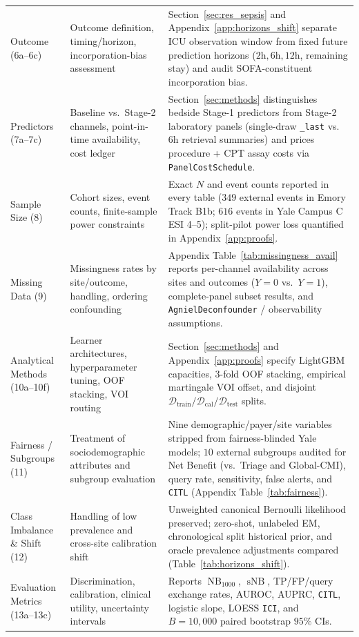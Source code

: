 \begin{table}[h!]
\begin{tabular}{>{\raggedright\arraybackslash}p{}>{\raggedright\arraybackslash}p{}>{\raggedright\arraybackslash}p{}}
Outcome (6a--6c) & Outcome definition, timing/horizon, incorporation-bias assessment & Section~\ref{sec:res_sepsis} and Appendix~\ref{app:horizons_shift} separate ICU observation window from fixed future prediction horizons ($2\text{h}, 6\text{h}, 12\text{h}$, remaining stay) and audit SOFA-constituent incorporation bias. \\
Predictors (7a--7c) & Baseline vs.\ Stage-2 channels, point-in-time availability, cost ledger & Section~\ref{sec:methods} distinguishes bedside Stage-1 predictors from Stage-2 laboratory panels (single-draw \texttt{\_last} vs.\ $6\text{h}$ retrieval summaries) and prices procedure + CPT assay costs via \texttt{PanelCostSchedule}. \\
Sample Size (8) & Cohort sizes, event counts, finite-sample power constraints & Exact $N$ and event counts reported in every table ($349$ external events in Emory Track B1b; $616$ events in Yale Campus C ESI 4--5); split-pilot power loss quantified in Appendix~\ref{app:proofs}. \\
Missing Data (9) & Missingness rates by site/outcome, handling, ordering confounding & Appendix Table~\ref{tab:missingness_avail} reports per-channel availability across sites and outcomes ($Y=0$ vs.\ $Y=1$), complete-panel subset results, and \texttt{AgnielDeconfounder} / \citet{vonkleist2025evaluation} observability assumptions. \\
Analytical Methods (10a--10f) & Learner architectures, hyperparameter tuning, OOF stacking, VOI routing & Section~\ref{sec:methods} and Appendix~\ref{app:proofs} specify LightGBM capacities, 3-fold OOF stacking, empirical martingale VOI offset, and disjoint $\mathcal{D}_{\text{train}}/\mathcal{D}_{\text{cal}}/\mathcal{D}_{\text{test}}$ splits. \\
Fairness / Subgroups (11) & Treatment of sociodemographic attributes and subgroup evaluation & Nine demographic/payer/site variables stripped from fairness-blinded Yale models; $10$ external subgroups audited for Net Benefit (vs.\ Triage and Global-CMI), query rate, sensitivity, false alerts, and \texttt{CITL} (Appendix Table~\ref{tab:fairness}). \\
Class Imbalance \& Shift (12) & Handling of low prevalence and cross-site calibration shift & Unweighted canonical Bernoulli likelihood preserved; zero-shot, unlabeled \citet{saerens2002adjusting} EM, chronological split historical prior, and oracle prevalence adjustments compared (Table~\ref{tab:horizons_shift}). \\
Evaluation Metrics (13a--13c) & Discrimination, calibration, clinical utility, uncertainty intervals & Reports $\operatorname{NB}_{1000}$, $\operatorname{sNB}$, TP/FP/query exchange rates, AUROC, AUPRC, \texttt{CITL}, logistic slope, LOESS \texttt{ICI}, and $B=10{,}000$ paired bootstrap $95\%$ CIs. \\

\end{tabular}
\end{table}
